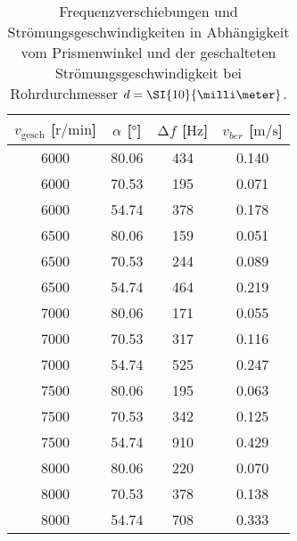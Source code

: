 \begin{table}
    \centering
    \caption{Frequenzverschiebungen und Strömungsgeschwindigkeiten in Abhängigkeit vom Prismenwinkel und der geschalteten Strömungsgeschwindigkeit bei Rohrdurchmesser $\protect d = \SI{10}{\milli\meter}$.}
    \label{tab:5}
    \begin{tabular}{c c c c}
        \toprule
        $v_{\text{gesch}}$ [$\si{{\text{r}}\per\minute}$]  & $\alpha$ [$\si{\degree}$]  & $\increment f$ [$\si{\hertz}$] &  $v_{ber}$ [$\si{\meter\per\second}$]\\
        \midrule
        6000    &   80.06    & 434   & 0.140 \\ 
        6000    &   70.53    & 195   & 0.071 \\ 
        6000    &   54.74    & 378   & 0.178 \\ 
        \midrule
        6500    &   80.06   & 159    & 0.051 \\ 
        6500    &   70.53   & 244    & 0.089 \\ 
        6500    &   54.74   & 464    & 0.219 \\ 
        \midrule
        7000    &   80.06   & 171    & 0.055 \\ 
        7000    &   70.53   & 317    & 0.116 \\ 
        7000    &   54.74   & 525    & 0.247 \\ 
        \midrule
        7500    &   80.06   & 195    & 0.063 \\ 
        7500    &   70.53   & 342    & 0.125 \\ 
        7500    &   54.74   & 910    & 0.429 \\ 
        \midrule
        8000    &   80.06   & 220    & 0.070 \\ 
        8000    &   70.53   & 378    & 0.138 \\ 
        8000    &   54.74   & 708    & 0.333 \\ 
        \bottomrule
    \end{tabular}
\end{table}

